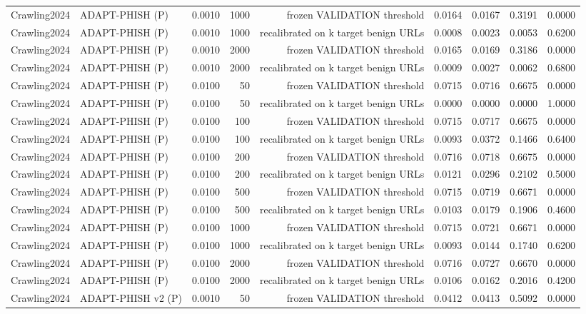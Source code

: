 \begin{table}[t]
\begin{tabular}{llrrrrrrr}
Crawling2024 & ADAPT-PHISH (P) & 0.0010 & 1000 & frozen VALIDATION threshold & 0.0164 & 0.0167 & 0.3191 & 0.0000 \\
Crawling2024 & ADAPT-PHISH (P) & 0.0010 & 1000 & recalibrated on k target benign URLs & 0.0008 & 0.0023 & 0.0053 & 0.6200 \\
Crawling2024 & ADAPT-PHISH (P) & 0.0010 & 2000 & frozen VALIDATION threshold & 0.0165 & 0.0169 & 0.3186 & 0.0000 \\
Crawling2024 & ADAPT-PHISH (P) & 0.0010 & 2000 & recalibrated on k target benign URLs & 0.0009 & 0.0027 & 0.0062 & 0.6800 \\
Crawling2024 & ADAPT-PHISH (P) & 0.0100 & 50 & frozen VALIDATION threshold & 0.0715 & 0.0716 & 0.6675 & 0.0000 \\
Crawling2024 & ADAPT-PHISH (P) & 0.0100 & 50 & recalibrated on k target benign URLs & 0.0000 & 0.0000 & 0.0000 & 1.0000 \\
Crawling2024 & ADAPT-PHISH (P) & 0.0100 & 100 & frozen VALIDATION threshold & 0.0715 & 0.0717 & 0.6675 & 0.0000 \\
Crawling2024 & ADAPT-PHISH (P) & 0.0100 & 100 & recalibrated on k target benign URLs & 0.0093 & 0.0372 & 0.1466 & 0.6400 \\
Crawling2024 & ADAPT-PHISH (P) & 0.0100 & 200 & frozen VALIDATION threshold & 0.0716 & 0.0718 & 0.6675 & 0.0000 \\
Crawling2024 & ADAPT-PHISH (P) & 0.0100 & 200 & recalibrated on k target benign URLs & 0.0121 & 0.0296 & 0.2102 & 0.5000 \\
Crawling2024 & ADAPT-PHISH (P) & 0.0100 & 500 & frozen VALIDATION threshold & 0.0715 & 0.0719 & 0.6671 & 0.0000 \\
Crawling2024 & ADAPT-PHISH (P) & 0.0100 & 500 & recalibrated on k target benign URLs & 0.0103 & 0.0179 & 0.1906 & 0.4600 \\
Crawling2024 & ADAPT-PHISH (P) & 0.0100 & 1000 & frozen VALIDATION threshold & 0.0715 & 0.0721 & 0.6671 & 0.0000 \\
Crawling2024 & ADAPT-PHISH (P) & 0.0100 & 1000 & recalibrated on k target benign URLs & 0.0093 & 0.0144 & 0.1740 & 0.6200 \\
Crawling2024 & ADAPT-PHISH (P) & 0.0100 & 2000 & frozen VALIDATION threshold & 0.0716 & 0.0727 & 0.6670 & 0.0000 \\
Crawling2024 & ADAPT-PHISH (P) & 0.0100 & 2000 & recalibrated on k target benign URLs & 0.0106 & 0.0162 & 0.2016 & 0.4200 \\
Crawling2024 & ADAPT-PHISH v2 (P) & 0.0010 & 50 & frozen VALIDATION threshold & 0.0412 & 0.0413 & 0.5092 & 0.0000 \\

\end{tabular}
\end{table}
